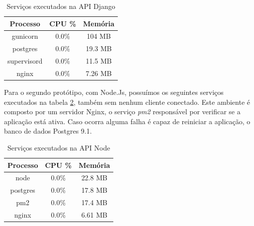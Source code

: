   \begin{table}[H]
    \centering
    \footnotesize
    \setlength{\abovecaptionskip}{0pt}
    \setlength{\belowcaptionskip}{0pt}
    \caption[Serviços executados na API Django]{Serviços executados na API Django}
    \label{tab:services-in-api-django}
    \begin{tabular}{c|c|c}
      \hline \hline
      Processo  & 	CPU \% &	Memória \\
      \hline \hline
      gunicorn &	0.0\% &		104 MB \\
      postgres &	0.0\% &		19.3 MB \\
      supervisord &	0.0\% &		11.5 MB \\
      nginx &		0.0\% &		7.26 MB \\
      \hline \hline
    \end{tabular}
  \end{table}
  
  \vspace{-1.9cm}

  Para o segundo protótipo, com Node.Js, possuímos os seguintes serviços executados na tabela \ref{tab:services-in-api-node}, 
  também sem nenhum cliente conectado. Este ambiente é composto por um servidor Nginx, o serviço \textit{pm2} responsável por
  verificar se a aplicação está ativa. Caso ocorra alguma falha é capaz de reiniciar a aplicação, 
  o banco de dados Postgres 9.1.
  
   \begin{table}[H]
    \centering
    \footnotesize
    \setlength{\abovecaptionskip}{0pt}
    \setlength{\belowcaptionskip}{0pt}
    \caption[Serviços executados na API Node]{Serviços executados na API Node}
    \label{tab:services-in-api-node}
    \begin{tabular}{c|c|c}
      \hline \hline
      Processo  & 	CPU \% &	Memória \\
      \hline \hline
      node &		0.0\% &		22.8 MB \\
      postgres &	0.0\% &		17.8 MB \\
      pm2 &		0.0\% &		17.4 MB \\
      nginx &		0.0\% &		6.61 MB \\
      \hline \hline
    \end{tabular}
  \end{table}
   
